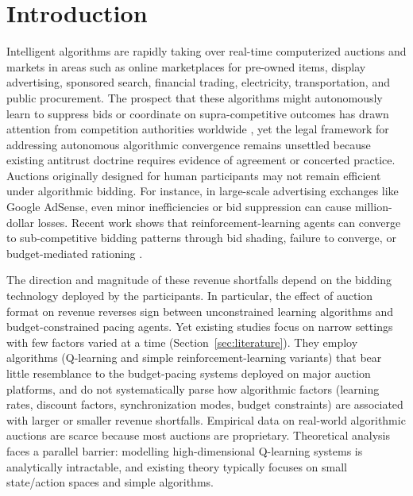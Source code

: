 \section{Introduction}

Intelligent algorithms are rapidly taking over real-time computerized auctions and markets in areas such as online marketplaces for pre-owned items, display advertising, sponsored search, financial trading, electricity, transportation, and public procurement. The prospect that these algorithms might autonomously learn to suppress bids or coordinate on supra-competitive outcomes has drawn attention from competition authorities worldwide \citep{OECD2017, EzrachiStucke2017}, yet the legal framework for addressing autonomous algorithmic convergence remains unsettled because existing antitrust doctrine requires evidence of agreement or concerted practice. Auctions originally designed for human participants may not remain efficient under algorithmic bidding. For instance, in large-scale advertising exchanges like Google AdSense, even minor inefficiencies or bid suppression can cause million-dollar losses. Recent work shows that reinforcement-learning agents can converge to sub-competitive bidding patterns through bid shading, failure to converge, or budget-mediated rationing \citep{Calvano2020, Klein2021, BanchioSkrzypacz2022}. 

The direction and magnitude of these revenue shortfalls depend on the bidding technology deployed by the participants. In particular, the effect of auction format on revenue reverses sign between unconstrained learning algorithms and budget-constrained pacing agents. Yet existing studies focus on narrow settings with few factors varied at a time (Section~\ref{sec:literature}). They employ algorithms (Q-learning and simple reinforcement-learning variants) that bear little resemblance to the budget-pacing systems deployed on major auction platforms, and do not systematically parse how algorithmic factors (learning rates, discount factors, synchronization modes, budget constraints) are associated with larger or smaller revenue shortfalls. Empirical data on real-world algorithmic auctions are scarce because most auctions are proprietary. Theoretical analysis faces a parallel barrier: modelling high-dimensional Q-learning systems is analytically intractable, and existing theory typically focuses on small state/action spaces and simple algorithms.


